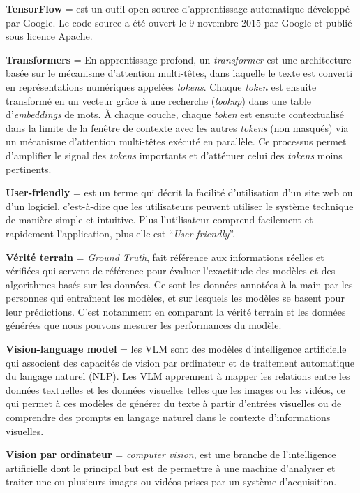 \textbf{TensorFlow} = est un outil open source d'apprentissage automatique développé par Google. Le code source a été ouvert le 9 novembre 2015 par Google et publié sous licence Apache.

\textbf{Transformers} = En apprentissage profond, un \textit{transformer} est une architecture basée sur le mécanisme d’attention multi-têtes, dans laquelle le texte est converti en représentations numériques appelées \textit{tokens}. Chaque \textit{token} est ensuite transformé en un vecteur grâce à une recherche (\textit{lookup}) dans une table d’\textit{embeddings} de mots. À chaque couche, chaque \textit{token} est ensuite contextualisé dans la limite de la fenêtre de contexte avec les autres \textit{tokens} (non masqués) via un mécanisme d’attention multi-têtes exécuté en parallèle. Ce processus permet d’amplifier le signal des \textit{tokens} importants et d’atténuer celui des \textit{tokens} moins pertinents.

\textbf{User-friendly} = est un terme qui décrit la facilité d’utilisation d’un site web ou d’un logiciel, c’est-à-dire que les utilisateurs peuvent utiliser le système technique de manière simple et intuitive. Plus l’utilisateur comprend facilement et rapidement l’application, plus elle est \enquote{\textit{User-friendly}}.

\textbf{Vérité terrain} = \textit{Ground Truth}, fait référence aux informations réelles et vérifiées qui servent de référence pour évaluer l'exactitude des modèles et des algorithmes basés sur les données. Ce sont les données annotées à la main par les personnes qui entraînent les modèles, et sur lesquels les modèles se basent pour leur prédictions. C'est notamment en comparant la vérité terrain et les données générées que nous pouvons mesurer les performances du modèle.

\textbf{Vision-language model} = les VLM sont des modèles d’intelligence artificielle qui associent des capacités de vision par ordinateur et de traitement automatique du langage naturel (NLP). Les VLM apprennent à mapper les relations entre les données textuelles et les données visuelles telles que les images ou les vidéos, ce qui permet à ces modèles de générer du texte à partir d’entrées visuelles ou de comprendre des prompts en langage naturel dans le contexte d’informations visuelles.

\textbf{Vision par ordinateur} = \textit{computer vision}, est une branche de l'intelligence artificielle dont le principal but est de permettre à une machine d'analyser et traiter une ou plusieurs images ou vidéos prises par un système d'acquisition.